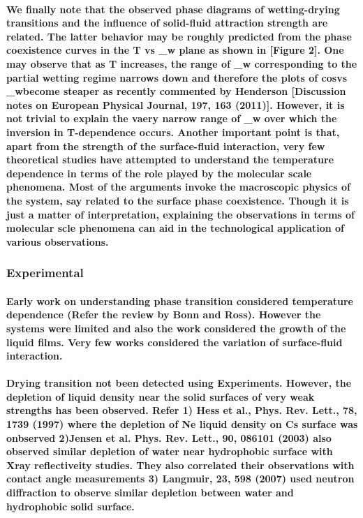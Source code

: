 \documentclass[a4paper,12pt,single,pdftex]{scrartcl}
\begin{document}
\label{ID_678529580}\paragraph{We finally note that the observed phase diagrams of wetting-drying transitions and the influence of solid-fluid attraction strength are related. The latter behavior may be roughly predicted from the phase coexistence curves in the T vs \epsilon_{w} plane as shown in [Figure 2]. One may observe that as T increases, the range of \epsilon_{w} corresponding to the partial wetting regime narrows down and therefore the plots of cos\theta vs \epsilon_{w}become steaper as recently commented by Henderson [Discussion notes on European Physical Journal, 197, 163 (2011)]. However, it is not trivial to explain the vaery narrow range of \epsilon_{w} over which the inversion in T-dependence occurs. Another important point is that, apart from the strength of the surface-fluid interaction, very few theoretical studies have attempted to understand the temperature dependence in terms of the role played by the molecular scale phenomena. Most of the arguments invoke the macroscopic physics of the system, say related to the surface phase coexistence. Though it is just a matter of interpretation, explaining the observations in terms of molecular scle phenomena can aid in the technological application of various observations.}

\label{ID_869146050}\subsubsection{Experimental}

\label{ID_566286120}\paragraph{Early work on understanding phase transition considered temperature dependence (Refer the review by Bonn and Ross). However the systems were limited and also the work considered the growth of the liquid films.  Very few works considered the variation of surface-fluid interaction.}

\label{ID_1447496666}\paragraph{Drying transition not been detected using Experiments. However, the depletion of liquid density near the solid surfaces of very weak strengths has been observed. Refer 1) Hess et al., Phys. Rev. Lett., 78, 1739 (1997) where the depletion of Ne liquid density on Cs surface was onbserved 2)Jensen et al. Phys. Rev. Lett., 90, 086101 (2003) also observed similar depletion of water near hydrophobic surface with Xray reflectiveity studies. They also correlated their observations with contact angle measurements 3) Langmuir, 23, 598 (2007) used neutron diffraction to observe similar depletion between water and hydrophobic solid surface.}
\end{document}
